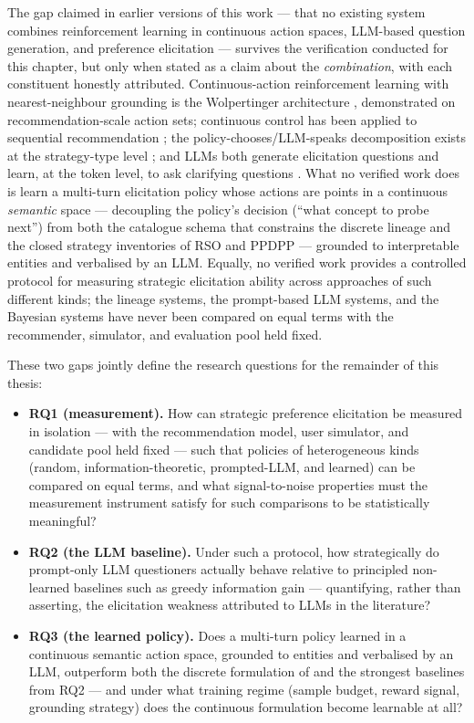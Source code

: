 The gap claimed in earlier versions of this work — that no existing system combines reinforcement learning in continuous action spaces, LLM-based question generation, and preference elicitation — survives the verification conducted for this chapter, but only when stated as a claim about the \textit{combination}, with each constituent honestly attributed. Continuous-action reinforcement learning with nearest-neighbour grounding is the Wolpertinger architecture \citep{dulacarnold2015deep}, demonstrated on recommendation-scale action sets; continuous control has been applied to sequential recommendation \citep{wang2024efficient}; the policy-chooses/LLM-speaks decomposition exists at the strategy-type level \citep{deng2023plug, zhao2025reinforced}; and LLMs both generate elicitation questions \citep{li2023eliciting, kostric2024generating} and learn, at the token level, to ask clarifying questions \citep{zhang2025modeling}. What no verified work does is learn a multi-turn elicitation policy whose actions are points in a continuous \textit{semantic} space — decoupling the policy's decision (``what concept to probe next'') from both the catalogue schema that constrains the discrete lineage and the closed strategy inventories of RSO and PPDPP — grounded to interpretable entities and verbalised by an LLM. Equally, no verified work provides a controlled protocol for measuring strategic elicitation ability across approaches of such different kinds; the lineage systems, the prompt-based LLM systems, and the Bayesian systems have never been compared on equal terms with the recommender, simulator, and evaluation pool held fixed.

These two gaps jointly define the research questions for the remainder of this thesis:

\begin{itemize}
    \item \textbf{RQ1 (measurement).} How can strategic preference elicitation be measured in isolation — with the recommendation model, user simulator, and candidate pool held fixed — such that policies of heterogeneous kinds (random, information-theoretic, prompted-LLM, and learned) can be compared on equal terms, and what signal-to-noise properties must the measurement instrument satisfy for such comparisons to be statistically meaningful?
    \item \textbf{RQ2 (the LLM baseline).} Under such a protocol, how strategically do prompt-only LLM questioners actually behave relative to principled non-learned baselines such as greedy information gain — quantifying, rather than asserting, the elicitation weakness attributed to LLMs in the literature?
    \item \textbf{RQ3 (the learned policy).} Does a multi-turn policy learned in a continuous semantic action space, grounded to entities and verbalised by an LLM, outperform both the discrete formulation of \citet{makarova2024learning} and the strongest baselines from RQ2 — and under what training regime (sample budget, reward signal, grounding strategy) does the continuous formulation become learnable at all?
\end{itemize}

